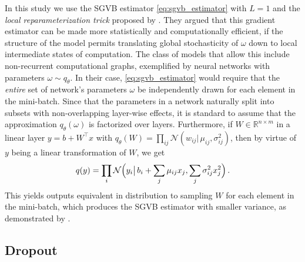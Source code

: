 \documentclass[a4paper,10pt,twocolumn]{article}
\begin{document}
In this study we use the SGVB estimator \eqref{eq:sgvb_estimator} with $L=1$ and the
\emph{local reparameterization trick} proposed by \citet{kingma_variational_2015}. They
argued that this gradient estimator can be made more statistically and computationally
efficient, if the structure of the model permits translating global stochasticity of
$\omega$ down to local intermediate states of computation.
%
The class of models that allow this include non-recurrent computational graphs,
exemplified by neural networks with parameters $\omega \sim q_\theta$. In their case,
\eqref{eq:sgvb_estimator} would require that the \emph{entire} set of network's parameters
$\omega$ be independently drawn for each element in the mini-batch. Since that the
parameters in a network naturally split into subsets with non-overlapping layer-wise
effects, it is standard to assume that the approximation $
  q_\theta(\omega)
$ is factorized over layers. Furthermore, if $
  W \in \mathbb{R}^{n\times m}
$ in a linear layer $
  y = b + W^\top x
$ with $
  q_\theta(W)
    = \prod_{ij}
      \mathcal{N}(w_{ij} \vert\, \mu_{ij}, \sigma_{ij}^2)
$, then by virtue of $y$ being a linear transformation of $W$, we get
\begin{equation}  \label{eq:r-gauss-trick}
  q(y) = \prod_i \mathcal{N}\Bigl(
        y_i \big\vert\,
        b_i + \sum_j \mu_{ij} x_j,
        \sum_j \sigma^2_{ij} x_j^2
    \Bigr)
  \,.
\end{equation}
This yields outputs equivalent in distribution to sampling $W$ for each element in
the mini-batch, which produces the SGVB estimator with smaller variance, as demonstrated
by \citet{kingma_variational_2015}.


\subsection{Dropout} %
\label{sub:dropout}
\end{document}
